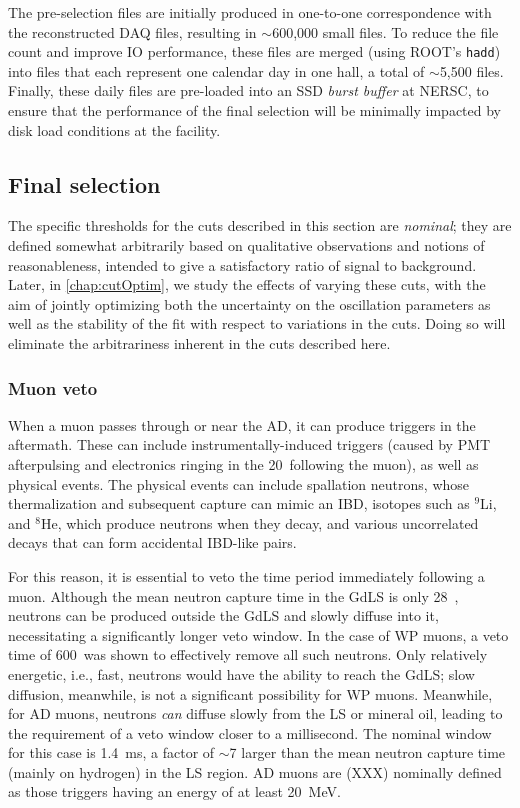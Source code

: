 \documentclass[../thesis.tex]{subfiles}
\begin{document}
The pre-selection files are initially produced in one-to-one correspondence with the reconstructed DAQ files, resulting in $\sim$600,000 small files. To reduce the file count and improve IO performance, these files are merged (using ROOT's \texttt{hadd}) into files that each represent one calendar day in one hall, a total of $\sim$5,500 files. Finally, these daily files are pre-loaded into an SSD \emph{burst buffer} at NERSC, to ensure that the performance of the final selection will be minimally impacted by disk load conditions at the facility.

\subsection{Final selection}
\label{sec:selFinalSel}

The specific thresholds for the cuts described in this section are \emph{nominal}; they are defined somewhat arbitrarily based on qualitative observations and notions of reasonableness, intended to give a satisfactory ratio of signal to background. Later, in \autoref{chap:cutOptim}, we study the effects of varying these cuts, with the aim of jointly optimizing both the uncertainty on the oscillation parameters as well as the stability of the fit with respect to variations in the cuts. Doing so will eliminate the arbitrariness inherent in the cuts described here.

\subsubsection{Muon veto}
\label{sec:selMuonVeto}

When a muon passes through or near the AD, it can produce triggers in the aftermath. These can include instrumentally-induced triggers (caused by PMT afterpulsing and electronics ringing in the 20~\us following the muon), as well as physical events. The physical events can include spallation neutrons, whose thermalization and subsequent capture can mimic an IBD, isotopes such as $^9$Li, and $^8$He, which produce neutrons when they decay, and various uncorrelated decays that can form accidental IBD-like pairs.

For this reason, it is essential to veto the time period immediately following a muon. Although the mean neutron capture time in the GdLS is only 28~\us, neutrons can be produced outside the GdLS and slowly diffuse into it, necessitating a significantly longer veto window. In the case of WP muons, a veto time of 600~\us was shown to effectively remove all such neutrons. Only relatively energetic, i.e., fast, neutrons would have the ability to reach the GdLS; slow diffusion, meanwhile, is not a significant possibility for WP muons. Meanwhile, for AD muons, neutrons \emph{can} diffuse slowly from the LS or mineral oil, leading to the requirement of a veto window closer to a millisecond. The nominal window for this case is 1.4~ms, a factor of $\sim$7 larger than the mean neutron capture time (mainly on hydrogen) in the LS region. AD muons are (XXX) nominally defined as those triggers having an energy of at least 20~MeV.
\end{document}
